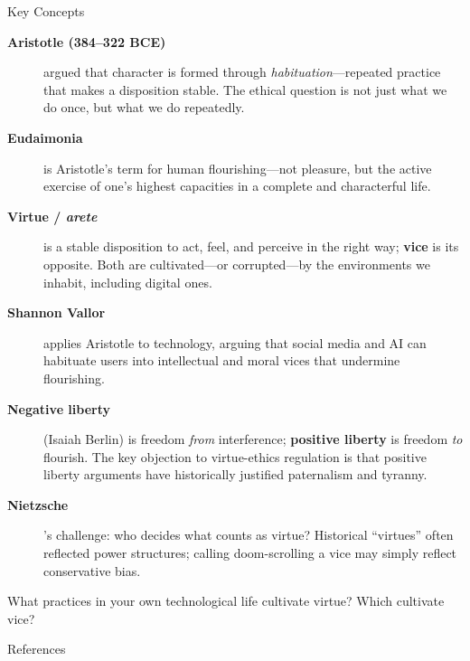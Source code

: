 ﻿\documentclass[aspectratio=169,11pt]{beamer}
\begin{document}
\begin{frame}[allowframebreaks]{Key Concepts}
\footnotesize
\begin{description}
    \item[\textbf{Aristotle (384--322 BCE)}] argued that character is formed through \textit{habituation}---repeated practice that makes a disposition stable. The ethical question is not just what we do once, but what we do repeatedly.
    \item[\textbf{Eudaimonia}] is Aristotle's term for human flourishing---not pleasure, but the active exercise of one's highest capacities in a complete and characterful life.
    \item[\textbf{Virtue / \textit{arete}}] is a stable disposition to act, feel, and perceive in the right way; \textbf{vice} is its opposite. Both are cultivated---or corrupted---by the environments we inhabit, including digital ones.
    \item[\textbf{Shannon Vallor}] applies Aristotle to technology, arguing that social media and AI can habituate users into intellectual and moral vices that undermine flourishing.
    \item[\textbf{Negative liberty}] (Isaiah Berlin) is freedom \textit{from} interference; \textbf{positive liberty} is freedom \textit{to} flourish. The key objection to virtue-ethics regulation is that positive liberty arguments have historically justified paternalism and tyranny.
    \item[\textbf{Nietzsche}]'s challenge: who decides what counts as virtue? Historical ``virtues'' often reflected power structures; calling doom-scrolling a vice may simply reflect conservative bias.
\end{description}

\begin{discussionbox}[Discussion]
What practices in your own technological life cultivate virtue? Which cultivate vice?
\end{discussionbox}
\end{frame}

\begin{frame}[allowframebreaks]{References}
\printbibliography[heading=none]
\end{frame}
\end{document}
